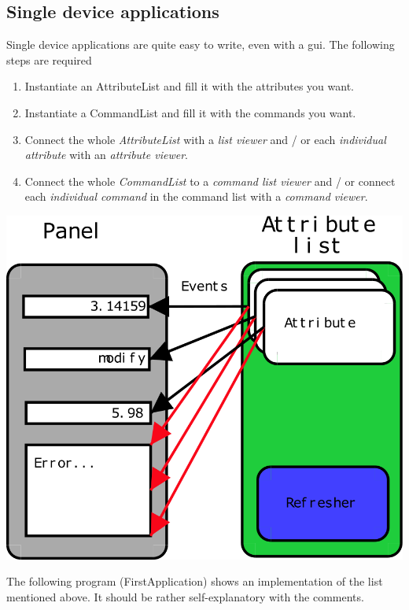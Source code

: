 \subsection{Single device applications}

Single device applications are quite easy to write, even with a gui.
The following steps are required
\begin{enumerate}
\item Instantiate an AttributeList and fill it with
the attributes you want. 
\item Instantiate a CommandList and fill it with the
commands you want. 
\item Connect the whole \emph{AttributeList} with a \emph{list viewer} and
/ or each \emph{individual attribute} with an \emph{attribute viewer}. 
\item Connect the whole \emph{CommandList} to a \emph{command list viewer}
and / or connect each \emph{individual command} in the command list
with a \emph{command viewer}. 
\end{enumerate}
\begin{center}
\includegraphics[scale=0.6]{atk/img/listpanel}
\par\end{center}

The following program (FirstApplication)
shows an implementation of the list mentioned above. It should be
rather self-explanatory with the comments.


